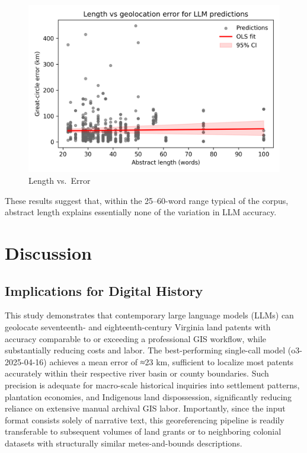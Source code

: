 \begin{figure}
\centering
\includegraphics[width=\textwidth,height=0.8\textheight,keepaspectratio]{figures/length_vs_error.png}
\caption{Length vs.~Error}\label{fig:length-vs-error}
\end{figure}

These results suggest that, within the 25--60-word range typical of the
corpus, abstract length explains essentially none of the variation in
LLM accuracy.

\section{Discussion}\label{discussion}

\subsection{Implications for Digital
History}\label{implications-for-digital-history}

This study demonstrates that contemporary large language models (LLMs)
can geolocate seventeenth- and eighteenth-century Virginia land patents
with accuracy comparable to or exceeding a professional GIS workflow,
while substantially reducing costs and labor. The best-performing
single-call model (o3-2025-04-16) achieves a mean error of ≈23 km,
sufficient to localize most patents accurately within their respective
river basin or county boundaries. Such precision is adequate for
macro-scale historical inquiries into settlement patterns, plantation
economies, and Indigenous land dispossession, significantly reducing
reliance on extensive manual archival GIS labor. Importantly, since the
input format consists solely of narrative text, this georeferencing
pipeline is readily transferable to subsequent volumes of land grants or
to neighboring colonial datasets with structurally similar
metes-and-bounds descriptions.

